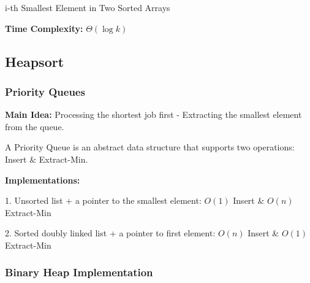 \documentclass[10pt]{article}
\begin{document}
\begin{algorithm}
	\SetAlgoLined
	
	\caption{i-th Smallest Element in Two Sorted Arrays}
\end{algorithm}

\textbf{Time Complexity:} $\Theta(\log k)$

\newpage

\subsection{Heapsort}

\subsubsection{Priority Queues}

\textbf{Main Idea:} Processing the shortest job first - Extracting the smallest element from the queue.

A Priority Queue is an abstract data structure that supports two 
operations: Insert \& Extract-Min.

\textbf{Implementations:}

1. Unsorted list + a pointer to the smallest element: $O(1)$ Insert \& $O(n)$ Extract-Min

2. Sorted doubly linked list + a pointer to first element: $O(n)$ Insert \& $O(1)$ Extract-Min

\subsubsection{Binary Heap Implementation}
\end{document}
